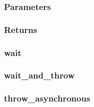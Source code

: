 \documentclass[letterpaper,10pt,english]{sphinxmanual}
\begin{document}
\begin{sphinxVerbatim}[commandchars=\\\{\}]
  
     
\end{sphinxVerbatim}
\subsubsection*{Parameters}

\begin{DUlineblock}{0em}
\item[]  \sphinxhyphen{}
\item[]  \sphinxhyphen{}
\end{DUlineblock}
\subsubsection*{Returns}


\subsubsection{wait}
\label{\detokenize{programming-interface/runtime/queue:wait}}
\begin{sphinxVerbatim}[commandchars=\\\{\}]
 
\end{sphinxVerbatim}


\subsubsection{wait\_and\_throw}
\label{\detokenize{programming-interface/runtime/queue:wait-and-throw}}
\begin{sphinxVerbatim}[commandchars=\\\{\}]
 
\end{sphinxVerbatim}


\subsubsection{throw\_asynchronous}
\label{\detokenize{programming-interface/runtime/queue:throw-asynchronous}}
\begin{sphinxVerbatim}[commandchars=\\\{\}]
 
\end{sphinxVerbatim}
\end{document}
